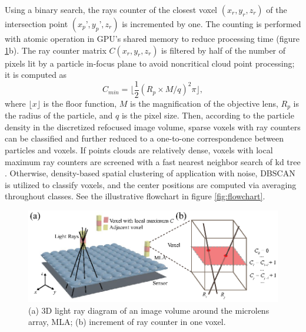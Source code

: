 \documentclass[draftthesis,fullpage]{uiucthesis}
\begin{document}
Using a binary search, the rays counter of the closest voxel $(x_r,y_r,z_r)$ of the intersection point $(x_p’, y_p’, z_r)$ is incremented by one. The counting is performed with atomic operation in GPU's shared memory to reduce processing time  (figure \ref{fig:ray_counter}b). The ray counter matrix $C(x_r,y_r,z_r)$ is filtered by half of the number of pixels lit by a particle in-focus plane to avoid noncritical cloud point processing; it is computed as
\begin{equation}
    C_{min} =  \lfloor \frac{1}{2}(R_p \times M / q)^2 \pi \rfloor,
  \label{eq:RayCounterThreshold}
\end{equation}
where $\lfloor x \rfloor$ is the floor function,  $M$ is the magnification of the objective lens, $R_p$ is the radius of the particle, and $q$ is the pixel size. Then, according to the particle density in the discretized refocused image volume, sparse voxels with ray counters can be classified and further reduced to a one-to-one correspondence between particles and voxels. If points clouds are relatively dense, voxels with local maximum ray counters are screened with a fast nearest neighbor search of kd tree \citep{ramasubramanian1989generalized}. Otherwise, density-based spatial clustering of application with noise, DBSCAN \citep{ester1996density} is utilized to classify voxels, and the center positions are computed via averaging throughout classes. See the illustrative flowchart in figure \ref{fig:flowchart}.

\begin{figure}[h]
       \centerline{\includegraphics[width=0.7\linewidth]{fig/figure2.eps}} 
       \caption{(a) 3D light ray diagram of an image volume around the microlens array, MLA; (b) increment of ray counter in one voxel.}
       \label{fig:ray_counter}
\end{figure}
       
\end{document}
